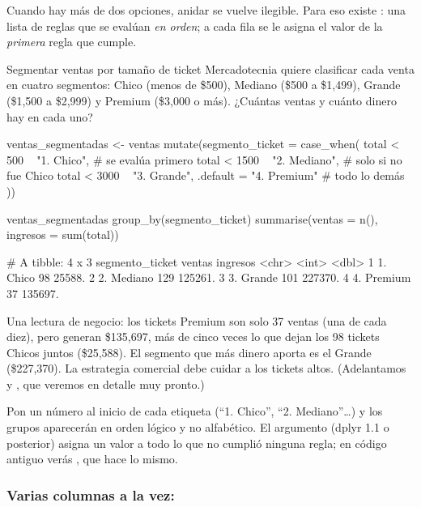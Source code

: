 Cuando hay más de dos opciones, anidar  se vuelve
ilegible. Para eso existe : una lista de reglas
 que se evalúan \emph{en orden}; a cada
fila se le asigna el valor de la \emph{primera} regla que cumple.

\begin{ejemplo}{Segmentar ventas por tamaño de ticket}
Mercadotecnia quiere clasificar cada venta en cuatro segmentos: Chico
(menos de \$500), Mediano (\$500 a \$1,499), Grande (\$1,500 a \$2,999) y
Premium (\$3,000 o más). ¿Cuántas ventas y cuánto dinero hay en cada uno?
\end{ejemplo}

\begin{rcode}
ventas_segmentadas <- ventas %
  mutate(segmento_ticket = case_when(
    total < 500   ~ "1. Chico",       # se evalúa primero
    total < 1500  ~ "2. Mediano",     # solo si no fue Chico
    total < 3000  ~ "3. Grande",
    .default      = "4. Premium"      # todo lo demás
  ))

ventas_segmentadas %
  group_by(segmento_ticket) %
  summarise(ventas = n(), ingresos = sum(total))
\end{rcode}
\begin{rsalida}
# A tibble: 4 x 3
  segmento_ticket ventas ingresos
  <chr>            <int>    <dbl>
1 1. Chico            98   25588.
2 2. Mediano         129  125261.
3 3. Grande          101  227370.
4 4. Premium          37  135697.
\end{rsalida}

Una lectura de negocio: los tickets Premium son solo 37 ventas (una de
cada diez), pero generan \$135,697, más de cinco veces lo que dejan los 98
tickets Chicos juntos (\$25,588). El segmento que más dinero aporta es el
Grande (\$227,370). La estrategia comercial debe cuidar a los tickets
altos. (Adelantamos
 y , que veremos en detalle muy
pronto.)

\begin{consejo}
Pon un número al inicio de cada etiqueta (``1. Chico'', ``2. Mediano''\ldots)
y los grupos aparecerán en orden lógico y no alfabético. El argumento
 (dplyr 1.1 o posterior) asigna un valor a todo lo que no
cumplió ninguna regla; en código antiguo verás ,
que hace lo mismo.
\end{consejo}

\subsubsection{Varias columnas a la vez: \texorpdfstring{}{across()}}

